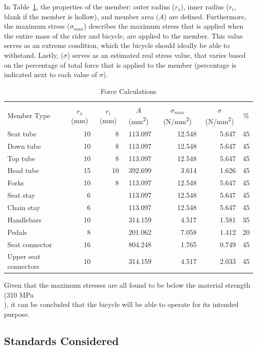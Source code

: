 \documentclass[a4paper,11pt]{article}
\begin{document}
In Table~\ref{tab:fo}, the properties of the member: outer radius ($r_{o}$), inner radius ($r_{i}$, blank if the member is hollow), and member area ($A$) are defined. Furthermore, the maximum stress (${\sigma}_{max}$) describes the maximum stress that is applied when the entire mass of the rider and bicycle, are applied to the member. This value serves as an extreme condition, which the bicycle should ideally be able to withstand. Lastly, (${\sigma}$) serves as an estimated real stress value, that varies based on the percentage of total force that is applied to the member (percentage is indicated next to each value of ${\sigma}$).

\begin{table}[!ht]
	\centering
	\caption{Force Calculations}
	\begin{tabular}{l r r r r r r}
		\hline\\[-2ex]
		Member Type&\multicolumn{1}{c}{$r_{o}$ (mm)}&\multicolumn{1}{c}{$r_{i}$ (mm)}&\multicolumn{1}{c}{$A$ (mm\textsuperscript{2})}&\multicolumn{1}{c}{${\sigma}_{max}$ (N/mm\textsuperscript{2})}&\multicolumn{1}{c}{${\sigma}$ (N/mm\textsuperscript{2})}&\multicolumn{1}{c}{\%}\\\hline
		Seat tube&10&8&113.097&12.548&5.647&45\\
		Down tube&10&8&113.097&12.548&5.647&45\\
		Top tube&10&8&113.097&12.548&5.647&45\\
		Head tube&15&10&392.699&3.614&1.626&45\\
		Forks&10&8&113.097&12.548&5.647&45\\
		Seat stay&6&&113.097&12.548&5.647&45\\
		Chain stay&6&&113.097&12.548&5.647&45\\
		Handlebars&10&&314.159&4.517&1.581&35\\
		Pedals&8&&201.062&7.058&1.412&20\\
		Seat connector&16&&804.248&1.765&0.749&45\\
		Upper seat connectors&10&&314.159&4.517&2.033&45\\
	\end{tabular}
	\label{tab:fo}
\end{table}

Given that the maximum stresses are all found to be below the material strength (310 MPa \\\cite{mif}), it can be concluded that the bicycle will be able to operate for its intended purpose.

\subsection{Standards Considered}
\label{sec:standard}
\end{document}
